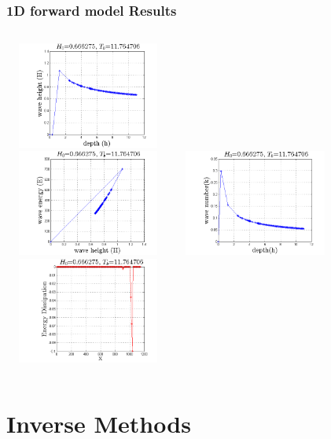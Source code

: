 \documentclass[7pt]{beamer}
\begin{document}
\begin{frame}
	\frametitle{1D forward model Results}
	   \begin{columns}[t]
        \centering
        \includegraphics[width=5.5cm,height=3.5cm]{img/Wave_height_Depth.png}\\
        \includegraphics[width=5.5cm,height=3.5cm]{img/Wave_energy_WaveHeight.png}
        \centering
       \includegraphics[width=5.5cm,height=3.5cm]{img/Wave_number_Depth.png}\\
       \includegraphics[width=5.5cm,height=3.5cm]{img/Energy_Dissipation_x.png}
      \end{columns}
\end{frame}

\section{Inverse Methods}
\end{document}
